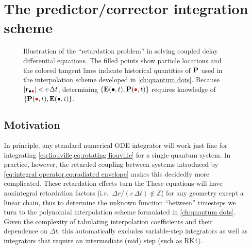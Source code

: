 \chapter{The predictor/corrector integration scheme}

\begin{figure}[]
  \centering
  \caption{\label{fig:retardation problem} Illustration of the ``retardation problem'' in solving coupled delay differential equations.
    The filled points show particle locations and the colored tangent lines indicate historical quantities of $\vb{P}$  used in the interpolation scheme developed in \cref{ch:quantum dots}. 
    Because $\abs{\vb{r}_{\bullet \textcolor[RGB]{228,26,28}{\bullet}}} < c \, \Delta t$, determining $\qty{\vb{E}(\bullet, t),\vb{P}(\textcolor[RGB]{228,26,28}{\bullet}, t)}$ requires knowledge of $\qty{\vb{P}(\textcolor[RGB]{228,26,28}{\bullet}, t), \vb{E}(\bullet, t)}$.
  }
\end{figure}

\section{Motivation}

In principle, any standard numerical ODE integrator will work just fine for integrating \cref{eq:liouville,eq:rotating liouville} for a single quantum system.
In practice, however, the retarded coupling between systems introduced by \cref{eq:integral operator,eq:radiated envelope} makes this decidedly more complicated.
These retardation effects turn the 
These equations will have nonintegral retardation factors (i.e.\ $\Delta r/(c \, \Delta t) \not \in \mathbb{Z}$) for any geometry except a linear chain, thus to determine the unknown function ``between'' timesteps we turn to the polynomial interpolation scheme formulated in \cref{ch:quantum dots}.
Given the complexity of tabulating interpolation coefficients and their dependence on $\Delta t$, this automatically excludes variable-step integrators as well as integrators that require an intermediate (mid) step (such as RK4). 

